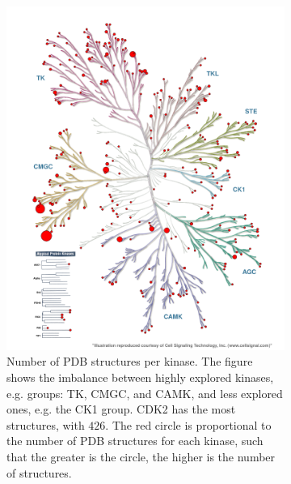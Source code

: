 \documentclass[9pt,training]{livecoms}
\begin{document}
\begin{figure}
     \centering
     \begin{subfigure}[b]{0.45\textwidth}
         \centering
         \includegraphics[width=\textwidth]{kinmap_n_structures_per_kinase.png}
         \caption{Number of PDB structures per kinase. The figure shows the imbalance between highly explored kinases, e.g. groups: TK, CMGC, and CAMK, and less explored ones, e.g. the CK1 group. CDK2 has the most structures, with $426$. The red circle is proportional to the number of PDB structures for each kinase, such that the greater is the circle, the higher is the number of structures.}
         \label{fig:structure_per_kinase}
     \end{subfigure}
     \hfill
     \begin{subfigure}[b]{0.45\textwidth}
         \centering

\end{subfigure}
\end{figure}
\end{document}
